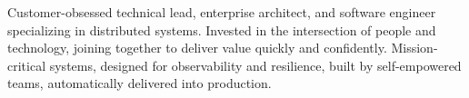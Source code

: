 

\begin{cvparagraph}

Customer-obsessed technical lead, enterprise architect, and software engineer specializing in distributed systems. Invested in the intersection of people and technology, joining together to deliver value quickly and confidently. Mission-critical systems, designed for observability and resilience, built by self-empowered teams, automatically delivered into production.
\end{cvparagraph}
